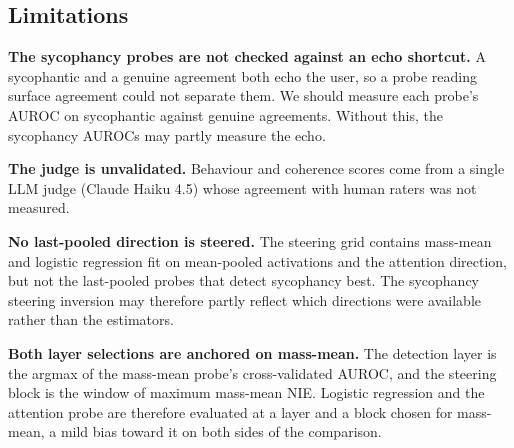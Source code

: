 
\subsection{Limitations}

\textbf{The sycophancy probes are not checked against an echo shortcut.}
A sycophantic and a genuine agreement both echo the user, so a probe
reading surface agreement could not separate them. We should measure each
probe's AUROC on sycophantic against genuine agreements. Without this, the sycophancy AUROCs may partly measure the
echo.

\textbf{The judge is unvalidated.} Behaviour and coherence scores come from
a single LLM judge (Claude Haiku 4.5) whose agreement with human raters was
not measured.

\textbf{No last-pooled direction is steered.} The steering grid contains
mass-mean and logistic regression fit on mean-pooled activations and the
attention direction, but not the last-pooled probes that detect sycophancy
best. The sycophancy steering inversion may therefore partly reflect which
directions were available rather than the estimators.

\textbf{Both layer selections are anchored on mass-mean.} The detection
layer is the argmax of the mass-mean probe's cross-validated AUROC, and the
steering block is the window of maximum mass-mean NIE. Logistic regression
and the attention probe are therefore evaluated at a layer and a block
chosen for mass-mean, a mild bias toward it on both sides of the
comparison.
